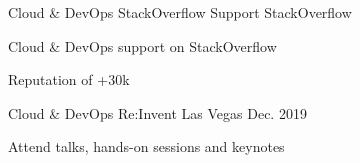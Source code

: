 \begin{cventries}
  \cventry
    {Cloud \& DevOps} %
    {StackOverflow Support} %
    {StackOverflow} %
    {} %
    {
      \begin{cvitems} %
        \item {Cloud \& DevOps support on StackOverflow}
        \item {Reputation of +30k}
      \end{cvitems}
    }

  \cventry
    {Cloud \& DevOps} %
    {Re:Invent} %
    {Las Vegas} %
    {Dec. 2019} %
    {
      \begin{cvitems} %
        \item {Attend talks, hands-on sessions and keynotes}
      \end{cvitems}
    }

\end{cventries}
